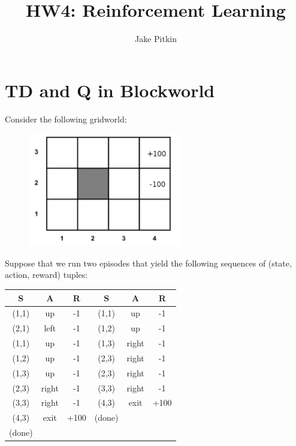 \documentclass[fleqn]{hw}
\title{HW4: Reinforcement Learning}
\institute{University of Utah}
\author{Jake Pitkin}
\begin{document}
\maketitle



\section{TD and Q in Blockworld}

Consider the following gridworld:
\begin{figure}[h!]
  \centering
  \includegraphics[width=0.6\textwidth]{GridWorld}
\end{figure}

Suppose that we run two episodes that yield the
following sequences of (state, action, reward) tuples:

\begin{tabular}{ccc|ccc}
{\bf S} & {\bf A} & {\bf R} & {\bf S} & {\bf A} & {\bf R} \\
\hline
(1,1) & up    & -1     & (1,1) & up    & -1 \\
(2,1) & left  & -1     & (1,2) & up    & -1 \\
(1,1) & up    & -1     & (1,3) & right & -1 \\
(1,2) & up    & -1     & (2,3) & right & -1 \\
(1,3) & up    & -1     & (2,3) & right & -1 \\
(2,3) & right & -1     & (3,3) & right & -1 \\
(3,3) & right & -1     & (4,3) & exit  & +100 \\
(4,3) & exit  & +100   & (done)&       & \\
(done)&       &        &       &       & \\
\end{tabular}
\end{document}
